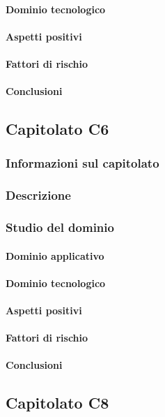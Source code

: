 	\paragraph{Dominio tecnologico}
	\paragraph{Aspetti positivi}
	\paragraph{Fattori di rischio}
	\paragraph{Conclusioni}
	
		\subsection{Capitolato C6}
	\subsubsection{Informazioni sul capitolato}
	\subsubsection{Descrizione}
	\subsubsection{Studio del dominio}
	\paragraph{Dominio applicativo}
	\paragraph{Dominio tecnologico}
	\paragraph{Aspetti positivi}
	\paragraph{Fattori di rischio}
	\paragraph{Conclusioni}
	
		\subsection{Capitolato C8}
